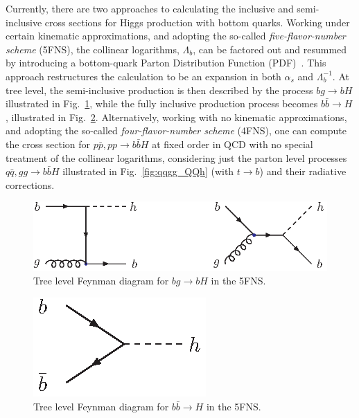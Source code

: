 \documentclass[11pt,prd,onecolumn,aps,floats,superscriptaddress,floatfix,nofootinbib]{revtex4-2}
\begin{document}
Currently, there are two approaches to calculating the inclusive and
semi-inclusive cross sections for Higgs production with bottom quarks.
Working under certain kinematic approximations, and adopting the
so-called {\it five-flavor-number scheme} (5FNS), the collinear
logarithms, $\Lambda_b$, can be factored out and resummed by
introducing a bottom-quark Parton Distribution Function
(PDF)~\cite{Barnett:1987jw,Olness:1987ep,Dicus:1988cx}.  This approach
restructures the calculation to be an expansion in both $\alpha_s$ and
$\Lambda_{b}^{-1}$. At tree level, the semi-inclusive production is
then described by the process $bg\rightarrow bH$ illustrated in
Fig.~\ref{fig:bghb_feyn}, while the fully inclusive production process
becomes $b\bar{b}\rightarrow H$, illustrated in
Fig.~\ref{fig:bbh_feyn}. Alternatively, working with no kinematic
approximations, and adopting the so-called {\it four-flavor-number
scheme} (4FNS), one can compute the cross section for $p\bar{p},pp \to
b\bar{b}H$ at fixed order in QCD with no special treatment of the
collinear logarithms, considering just the parton level processes
$q\bar{q},gg \to b\bar{b}H$ illustrated in Fig.~\ref{fig:qqgg_QQh}
(with $t\rightarrow b$) and their radiative corrections.
%
\begin{figure}
\begin{center}
\includegraphics[scale=1]{bghb_feyn.eps}
\vspace*{-0.2cm}
\caption[]{Tree level Feynman diagram for $bg\to bH$ in the 5FNS.\label{fig:bghb_feyn}}
\end{center}
\end{figure}
%
\begin{figure}
\begin{center}
\includegraphics[scale=0.9]{bbh_feyn.eps}
\vspace*{-0.2cm}
\caption[]{Tree level Feynman diagram for $b\bar{b}\to H$ in the 5FNS.\label{fig:bbh_feyn}}
\end{center}
\end{figure}
%
\end{document}
